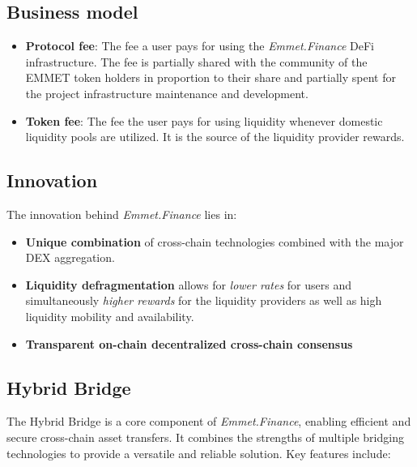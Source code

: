 \documentclass[12pt, a4paper]{article}
\begin{document}
\subsection{Business model}
    \begin{itemize}
        \item \textbf{Protocol fee}: The fee a user pays for using the \textit{Emmet.Finance} DeFi infrastructure. The fee is partially shared with the community of the EMMET token holders in proportion to their share and partially spent for the project infrastructure maintenance and development.
        \item \textbf{Token fee}: The fee the user pays for using liquidity whenever domestic liquidity pools are utilized. It is the source of the liquidity provider rewards.
    \end{itemize}

\subsection{Innovation}

The innovation behind \textit{Emmet.Finance} lies in:

\begin{itemize}
    \item \textbf{Unique combination} of cross-chain technologies combined with the major DEX aggregation. 
    \item \textbf{Liquidity defragmentation} allows for \textit{lower rates} for users and simultaneously \textit{higher rewards} for the liquidity providers as well as high liquidity mobility and availability.
    \item \textbf{Transparent on-chain decentralized cross-chain consensus}
\end{itemize}

\subsection{Hybrid Bridge}

The Hybrid Bridge is a core component of \textit{Emmet.Finance}, enabling efficient and secure cross-chain asset transfers. It combines the strengths of multiple bridging technologies to provide a versatile and reliable solution. Key features include:
\end{document}
